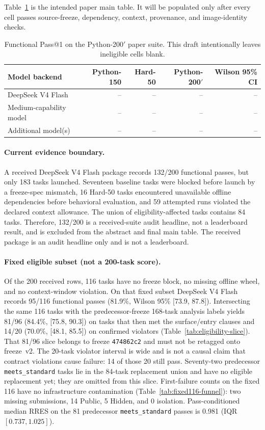 \documentclass[acmsmall,anonymous,review,screen]{acmart}
\newcommand{\rres}{\textsc{RRES}\xspace}
\begin{document}
Table~\ref{tab:main} is the intended paper main table. It will be populated
only after every cell passes source-freeze, dependency, context, provenance,
and image-identity checks.

\begin{table}[t]
  \caption{Functional Pass@1 on the Python-200$'$ paper suite. This draft
  intentionally leaves ineligible cells blank.}
  \label{tab:main}
  \centering
  \begin{tabular}{lrrrr}
    \toprule
    \textbf{Model backend} & \textbf{Python-150} & \textbf{Hard-50}
      & \textbf{Python-200$'$} & \textbf{Wilson 95\% CI} \\
    \midrule
    DeepSeek V4 Flash & -- & -- & -- & -- \\
    Medium-capability model & -- & -- & -- & -- \\
    Additional model(s) & -- & -- & -- & -- \\
    \bottomrule
  \end{tabular}
\end{table}

\paragraph{Current evidence boundary.}
A received DeepSeek V4 Flash package records 132/200 functional passes, but
only 183 tasks launched. Seventeen baseline tasks were blocked before launch by
a freeze-spec mismatch, 16 Hard-50 tasks encountered unavailable offline
dependencies before behavioral evaluation, and 59 attempted runs violated the
declared context allowance. The union of eligibility-affected tasks contains
84 tasks. Therefore, 132/200 is a received-suite audit headline, not a
leaderboard result, and is excluded from the abstract and final main table.
The received package is an audit headline only and is not a leaderboard.

\paragraph{Fixed eligible subset (not a 200-task score).}
Of the 200 received rows, 116 tasks have no freeze block, no missing offline
wheel, and no context-window violation. On that fixed subset DeepSeek V4 Flash
records 95/116 functional passes (81.9\%, Wilson 95\% [73.9, 87.8]).
Intersecting the same 116 tasks with the predecessor-freeze 168-task analysis labels yields 81/96
(84.4\%, [75.8, 90.3]) on tasks that then met the surface/entry clauses and 14/20
(70.0\%, [48.1, 85.5]) on confirmed violators (Table~\ref{tab:eligibility-slice}).
That 81/96 slice belongs to freeze \texttt{474862c2} and must not be retagged
onto freeze~v2. The 20-task violator interval is wide and is not a causal claim
that contract violations cause failure: 14 of those 20 still pass. Seventy-two
predecessor \texttt{meets\_standard} tasks lie in the 84-task replacement union
and have no eligible replacement yet; they are omitted from this slice. First-failure
counts on the fixed 116 have no infrastructure contamination
(Table~\ref{tab:fixed116-funnel}): two missing submissions, 14 Public, 5
Hidden, and 0 isolation. Pass-conditioned median \rres on the 81 predecessor
\texttt{meets\_standard} passes is 0.981 (IQR $[0.737, 1.025]$).
\end{document}

